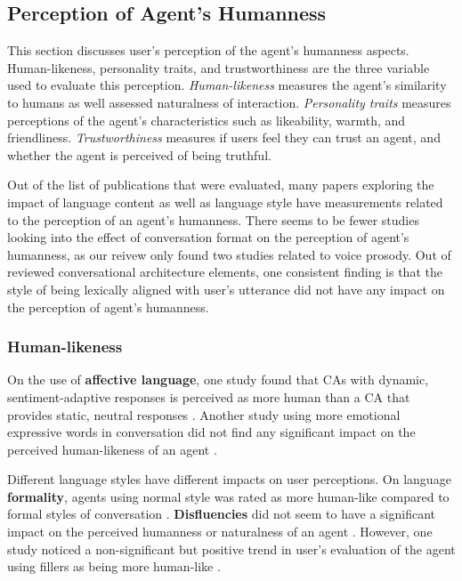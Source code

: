 \documentclass[sigconf,screen,review, anonymous]{acmart}
\newcommand{\cmt}[1]{}%
\begin{document}
\subsection{Perception of Agent's Humanness}

This section discusses user's perception of the agent's humanness aspects. Human-likeness, personality traits, and trustworthiness are the three variable used to evaluate this perception. \textit{Human-likeness} measures the agent's similarity to humans as well assessed naturalness of interaction. \textit{Personality traits} measures perceptions of the agent's characteristics such as likeability, warmth, and friendliness. \textit{Trustworthiness} measures if users feel they can trust an agent, and whether the agent is perceived of being truthful.

Out of the list of publications that were evaluated, many papers exploring the impact of language content as well as language style have measurements related to the perception of an agent's humanness. There seems to be fewer studies looking into the effect of conversation format on the perception of agent's humanness, as our reivew only found two studies related to voice prosody. Out of reviewed conversational architecture elements, one consistent finding is that the style of being lexically aligned with user's utterance did not have any impact on the perception of agent's humanness.

\subsubsection{Human-likeness}

On the use of \textbf{affective language}, one study found that CAs with dynamic, sentiment-adaptive responses is perceived as more human than a CA that provides static, neutral responses \cite{diederich2019emulating}\cmt{[25]}. Another study using more emotional expressive words in conversation did not find any significant impact on the perceived human-likeness of an agent \cite{zhu2022effects}\cmt{[26]}.

Different language styles have different impacts on user perceptions. On language \textbf{formality}, agents using normal style was rated as more human-like compared to formal styles of conversation \cite{ouchi2019should}\cmt{[59]}. \textbf{Disfluencies} did not seem to have a significant impact on the perceived humanness or naturalness of an agent \cite{jeong2019exploring}\cmt{[10]}\cite{pfeifer2009should}\cmt{[12]}. However, one study noticed a non-significant but positive trend in user's evaluation of the agent using fillers as being more human-like \cite{jeong2019exploring}\cmt{[10]}.
\end{document}
